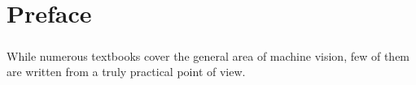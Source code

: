\chapter{Preface} 

\paragraph*{}
While numerous textbooks cover the general area of machine vision, few of them are written from a truly practical point of view.


\pagebreak